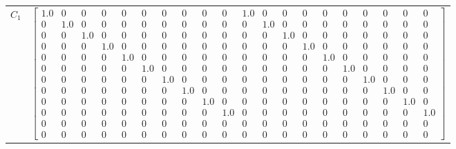 \begin{tabular}{cl}
 $C_{1}$  & $\left[\begin{array}{cccccccccccccccccccc}1.0 & 0 & 0 & 0 & 0 & 0 & 0 & 0 & 0 & 0 & 1.0 & 0 & 0 & 0 & 0 & 0 & 0 & 0 & 0 & 0\\0 & 1.0 & 0 & 0 & 0 & 0 & 0 & 0 & 0 & 0 & 0 & 1.0 & 0 & 0 & 0 & 0 & 0 & 0 & 0 & 0\\0 & 0 & 1.0 & 0 & 0 & 0 & 0 & 0 & 0 & 0 & 0 & 0 & 1.0 & 0 & 0 & 0 & 0 & 0 & 0 & 0\\0 & 0 & 0 & 1.0 & 0 & 0 & 0 & 0 & 0 & 0 & 0 & 0 & 0 & 1.0 & 0 & 0 & 0 & 0 & 0 & 0\\0 & 0 & 0 & 0 & 1.0 & 0 & 0 & 0 & 0 & 0 & 0 & 0 & 0 & 0 & 1.0 & 0 & 0 & 0 & 0 & 0\\0 & 0 & 0 & 0 & 0 & 1.0 & 0 & 0 & 0 & 0 & 0 & 0 & 0 & 0 & 0 & 1.0 & 0 & 0 & 0 & 0\\0 & 0 & 0 & 0 & 0 & 0 & 1.0 & 0 & 0 & 0 & 0 & 0 & 0 & 0 & 0 & 0 & 1.0 & 0 & 0 & 0\\0 & 0 & 0 & 0 & 0 & 0 & 0 & 1.0 & 0 & 0 & 0 & 0 & 0 & 0 & 0 & 0 & 0 & 1.0 & 0 & 0\\0 & 0 & 0 & 0 & 0 & 0 & 0 & 0 & 1.0 & 0 & 0 & 0 & 0 & 0 & 0 & 0 & 0 & 0 & 1.0 & 0\\0 & 0 & 0 & 0 & 0 & 0 & 0 & 0 & 0 & 1.0 & 0 & 0 & 0 & 0 & 0 & 0 & 0 & 0 & 0 & 1.0\\0 & 0 & 0 & 0 & 0 & 0 & 0 & 0 & 0 & 0 & 0 & 0 & 0 & 0 & 0 & 0 & 0 & 0 & 0 & 0\\0 & 0 & 0 & 0 & 0 & 0 & 0 & 0 & 0 & 0 & 0 & 0 & 0 & 0 & 0 & 0 & 0 & 0 & 0 & 0\end{array}\right]$                                                                                                                                                                                                                                                                                                                                                                                                                                                                                                                                                                                                                                                                                                                                                         \\

\end{tabular}
